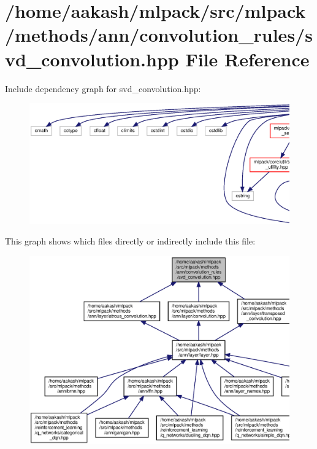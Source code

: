 \section{/home/aakash/mlpack/src/mlpack/methods/ann/convolution\+\_\+rules/svd\+\_\+convolution.hpp File Reference}
\label{svd__convolution_8hpp}
Include dependency graph for svd\+\_\+convolution.\+hpp\+:
\nopagebreak
\begin{figure}[H]
\begin{center}
\leavevmode
\includegraphics[width=350pt]{svd__convolution_8hpp__incl}
\end{center}
\end{figure}
This graph shows which files directly or indirectly include this file\+:
\nopagebreak
\begin{figure}[H]
\begin{center}
\leavevmode
\includegraphics[width=350pt]{svd__convolution_8hpp__dep__incl}
\end{center}
\end{figure}
